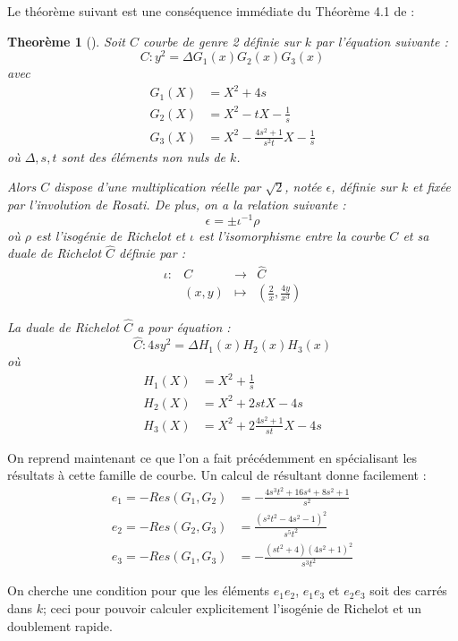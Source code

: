 \documentclass[a4paper]{article}
\newtheorem{theoreme}{Theorème}[section]
\theoremstyle{definition}
\theoremstyle{remark}
\numberwithin{equation}{section}
\begin{document}
Le théorème suivant est une conséquence immédiate du Théorème 4.1 de \citep{bending} :
\begin{theoreme}[\citet{bending}]
\label{bending}
Soit $C$ courbe de genre 2 définie sur $k$ par l'équation suivante :
$$C : y^2 = \Delta G_1(x)G_2(x)G_3(x)$$
avec
\begin{align*}
G_1(X) &= X^2 + 4s \\
G_2(X) &= X^2 - tX - \frac{1}{s} \\
G_3(X) &= X^2 - \frac{4s^2+1}{s^2t}X - \frac{1}{s}
\end{align*}
où $\Delta,s,t$ sont des éléments non nuls de $k$.

Alors $C$ dispose d'une multiplication réelle par $\sqrt2$, notée $\epsilon$, définie sur $k$ et fixée par l'involution de Rosati. De plus, on a la relation suivante :
$$\epsilon = \pm \iota^{-1}\rho$$
où $\rho$ est l'isogénie de Richelot et $\iota$ est l'isomorphisme entre la courbe $C$ et sa duale de Richelot $\hat{C}$ définie par :
\begin{equation*}
\begin{array}{lrcl}
\iota :&C & \longrightarrow & \hat{C} \\
& (x,y) & \longmapsto & (\frac{2}{x},\frac{4y}{x^3})
\end{array}
\end{equation*}

La duale de Richelot $\hat{C}$ a pour équation :
$$\hat{C} : 4sy^2 = \Delta H_1(x)H_2(x)H_3(x)$$
où
\begin{align*}
H_1(X) &= X^2 + \frac{1}{s} \\
H_2(X) &= X^2 + 2stX - 4s \\
H_3(X) &= X^2 + 2\frac{4s^2+1}{st}X - 4s
\end{align*}
\end{theoreme}

On reprend maintenant ce que l'on a fait précédemment en spécialisant les résultats à cette famille de courbe. Un calcul de résultant donne facilement :
\begin{align*}
e_1 = -Res(G_1,G_2) &= -\frac{4s^3t^2 + 16s^4 + 8s^2 + 1}{s^2} \\
e_2 = -Res(G_2,G_3) &= \frac{(s^2t^2 - 4s^2 - 1)^2}{s^5t^2} \\
e_3 = -Res(G_1,G_3) &= -\frac{(st^2 + 4)(4s^2 + 1)^2}{s^3t^2}
\end{align*}

On cherche une condition pour que les éléments $e_1e_2$, $e_1e_3$ et $e_2e_3$ soit des carrés dans $k$; ceci pour pouvoir calculer explicitement l'isogénie de Richelot et un doublement rapide.
\end{document}
